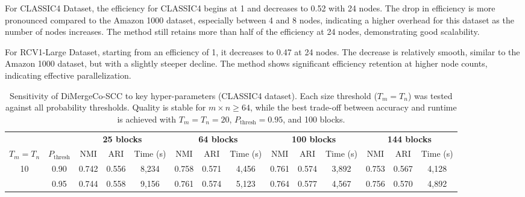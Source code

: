 \documentclass[journal]{IEEEtran}
\begin{document}
For CLASSIC4 Dataset, the efficiency for CLASSIC4 begins at 1 and decreases to 0.52 with 24 nodes. The drop in efficiency is more pronounced compared to the Amazon 1000 dataset, especially between 4 and 8 nodes, indicating a higher overhead for this dataset as the number of nodes increases. The method still retains more than half of the efficiency at 24 nodes, demonstrating good scalability.

For RCV1-Large Dataset, starting from an efficiency of 1, it decreases to 0.47 at 24 nodes. The decrease is relatively smooth, similar to the Amazon 1000 dataset, but with a slightly steeper decline. The method shows significant efficiency retention at higher node counts, indicating effective parallelization.

\begin{table}[t]
    \centering
    \caption{Sensitivity of DiMergeCo-SCC to key hyper-parameters (CLASSIC4 dataset). Each size threshold ($T_m=T_n$) was tested against all probability thresholds. Quality is stable for $m\times n\ge64$, while the best trade-off between accuracy and runtime is achieved with $T_m=T_n=20$, $P_{\text{thresh}}=0.95$, and 100 blocks.}
    \label{tab:param_sens}
    \begin{tabular}{cccccccccccccc}
        \toprule
                            &                     & \multicolumn{3}{c}{\textbf{25 blocks}} & \multicolumn{3}{c}{\textbf{64 blocks}} & \multicolumn{3}{c}{\textbf{100 blocks}} & \multicolumn{3}{c}{\textbf{144 blocks}}                                                                                                  \\
        \cmidrule(lr){3-5}\cmidrule(lr){6-8}\cmidrule(lr){9-11}\cmidrule(lr){12-14}
        $T_m{=}T_n$         & $P_{\text{thresh}}$ & NMI                                    & ARI                                    & Time (s)                                & NMI                                     & ARI   & Time (s) & NMI            & ARI            & Time (s)       & NMI   & ARI   & Time (s) \\
        \midrule
        \multirow{3}{*}{10} & 0.90                & 0.742                                  & 0.556                                  & 8,234                                   & 0.758                                   & 0.571 & 4,456    & 0.761          & 0.574          & 3,892          & 0.753 & 0.567 & 4,128    \\
                            & 0.95                & 0.744                                  & 0.558                                  & 9,156                                   & 0.761                                   & 0.574 & 5,123    & 0.764          & 0.577          & 4,567          & 0.756 & 0.570 & 4,892    \\

\end{tabular}
\end{table}
\end{document}
